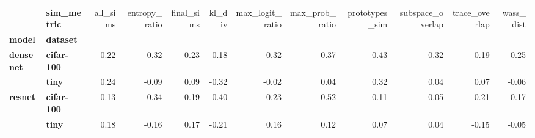 \begin{tabular}{llrrrrrrrrrr}
\toprule
       & \textbf{sim\_metric} &  all\_sims &  entropy\_ratio &  final\_sims &  kl\_div &  max\_logit\_ratio &  max\_prob\_ratio &  prototypes\_sim &  subspace\_overlap &  trace\_overlap &  wass\_dist \\
\textbf{model} & \textbf{dataset} &           &                &             &         &                  &                 &                 &                   &                &            \\
\midrule
\multirow{2}{*}{\textbf{densenet}} & \textbf{cifar-100} &      0.22 &          -0.32 &        0.23 &   -0.18 &             0.32 &            0.37 &           -0.43 &              0.32 &           0.19 &       0.25 \\
       & \textbf{tiny} &      0.24 &          -0.09 &        0.09 &   -0.32 &            -0.02 &            0.04 &            0.32 &              0.04 &           0.07 &      -0.06 \\
\cline{1-12}
\multirow{2}{*}{\textbf{resnet}} & \textbf{cifar-100} &     -0.13 &          -0.34 &       -0.19 &   -0.40 &             0.23 &            0.52 &           -0.11 &             -0.05 &           0.21 &      -0.17 \\
       & \textbf{tiny} &      0.18 &          -0.16 &        0.17 &   -0.21 &             0.16 &            0.12 &            0.07 &              0.04 &          -0.15 &      -0.05 \\
\bottomrule
\end{tabular}
